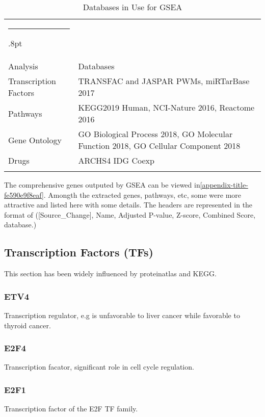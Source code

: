 \documentclass[3p,authoryear,preprint,12pt]{elsarticle}
\makeatletter
\def\hlinewd#1{%
  \noalign{\ifnum0=`}\fi\hrule \@height #1%
  \futurelet\reserved@a\@xhline}
\def\tbltoprule{\hlinewd{.8pt}\\[-12pt]}
\def\tblbottomrule{\noalign{\vspace*{6pt}}\hline\noalign{\vspace*{2pt}}}
\def\tblmidrule{\noalign{\vspace*{6pt}}\hline\noalign{\vspace*{2pt}}}
\makeatother
\begin{document}
\begin{table*}[!htbp]
\caption{{Databases in Use for GSEA} }
\label{tw-de478ae31cc6}
\def\arraystretch{1}
\ignorespaces 
\centering 
\begin{tabulary}{\linewidth}{p{\dimexpr.2732\tabcolsep}p{\dimexpr.7267999999999999\tabcolsep}}
\tbltoprule Analysis & Databases\\
\tblmidrule 
Transcription Factors &
  TRANSFAC and JASPAR PWMs, miRTarBase 2017\\
Pathways &
  KEGG2019 Human, NCI-Nature 2016, Reactome 2016\\
Gene Ontology &
  GO Biological Process 2018, GO Molecular Function 2018, GO Cellular Component 2018\\
Drugs &
  ARCHS4 IDG Coexp\\
\tblbottomrule 
\end{tabulary}\par 
\end{table*}
The comprehensive genes outputed by GSEA can be viewed in\ref{appendix-title-fe590e9f8eaf}. Amongth the extracted genes, pathways, etc, some were more attractive and listed here with some details. The headers are represented in the format of ([Source\_Change], Name, Adjusted P-value, Z-score, Combined Score, database.) %



\subsection{Transcription Factors (TFs)}This section has been widely influenced by proteinatlas and  KEGG.

\subsubsection{ETV4}Transcription regulator, e.g is unfavorable to liver cancer while favorable to thyroid cancer.

\subsubsection{E2F4}Transcription facator, significant role in cell cycle regulation. 

\subsubsection{E2F1}Transcription factor of the E2F TF family.
\end{document}
